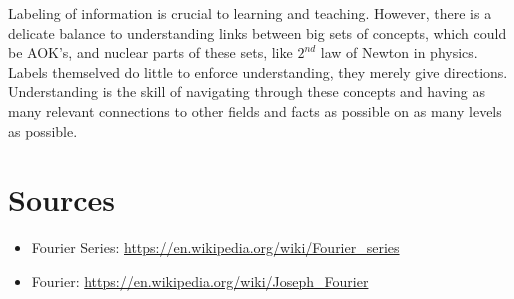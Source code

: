 \documentclass{report}
\begin{document}
Labeling of information is crucial to learning and teaching. However, there is a delicate balance to understanding links between big sets of concepts, which could be 
AOK's, and nuclear parts of these sets, like $2^{nd}$ law of Newton in physics. Labels themselved do little to enforce understanding, they merely give directions. 
Understanding is the skill of navigating through these concepts and having as many relevant connections to other fields and facts as possible on as many levels as 
possible.

\section*{Sources}
\begin{itemize}
    \item Fourier Series: \url{https://en.wikipedia.org/wiki/Fourier_series}
    \item Fourier: \url{https://en.wikipedia.org/wiki/Joseph_Fourier}
\end{itemize}
\end{document}
